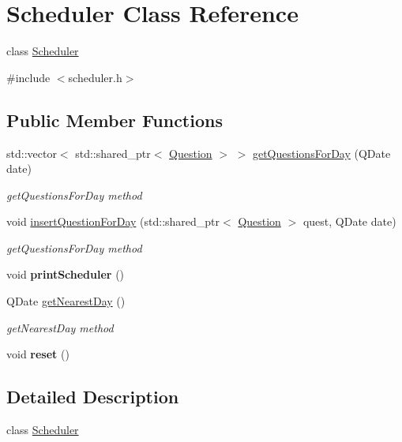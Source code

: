 \hypertarget{class_scheduler}{}\section{Scheduler Class Reference}
\label{class_scheduler}


class \hyperlink{class_scheduler}{Scheduler}  




{\ttfamily \#include $<$scheduler.\+h$>$}

\subsection*{Public Member Functions}
\begin{DoxyCompactItemize}
\item 
std\+::vector$<$ std\+::shared\+\_\+ptr$<$ \hyperlink{class_question}{Question} $>$ $>$ \hyperlink{class_scheduler_a4b18e745206d38e55dc115fbfa5af01f}{get\+Questions\+For\+Day} (Q\+Date date)
\begin{DoxyCompactList}\small\item\em get\+Questions\+For\+Day method \end{DoxyCompactList}\item 
void \hyperlink{class_scheduler_a8437191585dee71d765d3fcdc9f4af72}{insert\+Question\+For\+Day} (std\+::shared\+\_\+ptr$<$ \hyperlink{class_question}{Question} $>$ quest, Q\+Date date)
\begin{DoxyCompactList}\small\item\em get\+Questions\+For\+Day method \end{DoxyCompactList}\item 
\mbox{\label{class_scheduler_a49ee5f857170c25482896dc6759cad3a}} 
void {\bfseries print\+Scheduler} ()
\item 
Q\+Date \hyperlink{class_scheduler_ab959a8b807537fe7035261dfcad2e985}{get\+Nearest\+Day} ()
\begin{DoxyCompactList}\small\item\em get\+Nearest\+Day method \end{DoxyCompactList}\item 
\mbox{\label{class_scheduler_a9b6a056b6e27c4bb0b5c342d24718e53}} 
void {\bfseries reset} ()
\end{DoxyCompactItemize}


\subsection{Detailed Description}
class \hyperlink{class_scheduler}{Scheduler} 

